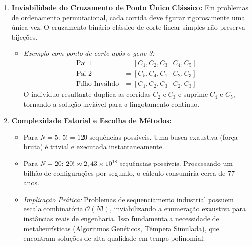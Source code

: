 \begin{enumerate}[label=(\alph*)]
    \item \textbf{Inviabilidade do Cruzamento de Ponto Único Clássico:}
    Em problemas de ordenamento permutacional, cada corrida deve figurar rigorosamente uma única vez. O cruzamento binário clássico de corte linear simples não preserva bijeções.
    \begin{itemize}
        \item \textit{Exemplo com ponto de corte após o gene 3:}
        \begin{align*}
            \text{Pai 1} &= [C_1, C_2, C_3 \mid C_4, C_5] \\
            \text{Pai 2} &= [C_5, C_4, C_1 \mid C_2, C_3] \\
            \text{Filho Inválido} &= [C_1, C_2, C_3 \mid C_2, C_3]
        \end{align*}
        O indivíduo resultante duplica as corridas $C_2$ e $C_3$ e suprime $C_4$ e $C_5$, tornando a solução inviável para o lingotamento contínuo.
    \end{itemize}

    \item \textbf{Complexidade Fatorial e Escolha de Métodos:}
    \begin{itemize}
        \item Para $N = 5$: $5! = 120$ sequências possíveis. Uma busca exaustiva (força-bruta) é trivial e executada instantaneamente.
        \item Para $N = 20$: $20! \approx 2{,}43 \times 10^{18}$ sequências possíveis. Processando um bilhão de configurações por segundo, o cálculo consumiria cerca de 77 anos.
        \item \textit{Implicação Prática:} Problemas de sequenciamento industrial possuem escala combinatória $\mathcal{O}(N!)$, inviabilizando a enumeração exaustiva para instâncias reais de engenharia. Isso fundamenta a necessidade de metaheurísticas (Algoritmos Genéticos, Têmpera Simulada), que encontram soluções de alta qualidade em tempo polinomial.
    \end{itemize}
\end{enumerate}